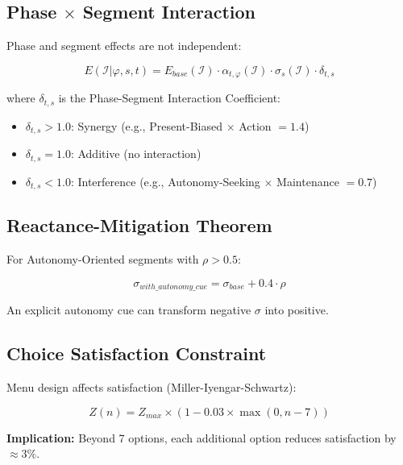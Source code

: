 \subsection{Phase $\times$ Segment Interaction}

Phase and segment effects are not independent:

\begin{equation}
\boxed{
E(\mathcal{I} | \varphi, s, t) = E_{base}(\mathcal{I}) \cdot \alpha_{t,\varphi}(\mathcal{I}) \cdot \sigma_s(\mathcal{I}) \cdot \delta_{t,s}
}
\label{eq:mp-phase-segment}
\end{equation}

where $\delta_{t,s}$ is the Phase-Segment Interaction Coefficient:
\begin{itemize}[nosep]
\item $\delta_{t,s} > 1.0$: Synergy (e.g., Present-Biased $\times$ Action $= 1.4$)
\item $\delta_{t,s} = 1.0$: Additive (no interaction)
\item $\delta_{t,s} < 1.0$: Interference (e.g., Autonomy-Seeking $\times$ Maintenance $= 0.7$)
\end{itemize}

\subsection{Reactance-Mitigation Theorem}

For Autonomy-Oriented segments with $\rho > 0.5$:

\begin{equation}
\boxed{
\sigma_{with\_autonomy\_cue} = \sigma_{base} + 0.4 \cdot \rho
}
\label{eq:mp-reactance-mitigation}
\end{equation}

An explicit autonomy cue can transform negative $\sigma$ into positive.

\subsection{Choice Satisfaction Constraint}

Menu design affects satisfaction (Miller-Iyengar-Schwartz):

\begin{equation}
\boxed{
Z(n) = Z_{max} \times (1 - 0.03 \times \max(0, n-7))
}
\label{eq:mp-choice-satisfaction}
\end{equation}

\textbf{Implication:} Beyond 7 options, each additional option reduces satisfaction by $\approx 3\%$.

